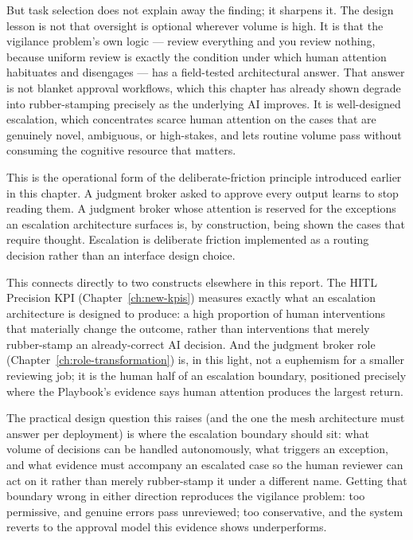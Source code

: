 But task selection does not explain away the finding; it sharpens it. The design lesson is not that oversight is optional wherever volume is high. It is that the vigilance problem's own logic --- review everything and you review nothing, because uniform review is exactly the condition under which human attention habituates and disengages --- has a field-tested architectural answer. That answer is not blanket approval workflows, which this chapter has already shown degrade into rubber-stamping precisely as the underlying AI improves. It is well-designed escalation, which concentrates scarce human attention on the cases that are genuinely novel, ambiguous, or high-stakes, and lets routine volume pass without consuming the cognitive resource that matters.

\begin{keyinsight}[title={Deliberate Friction, Operationalised}]
This is the operational form of the deliberate-friction principle introduced earlier in this chapter. A judgment broker asked to approve every output learns to stop reading them. A judgment broker whose attention is reserved for the exceptions an escalation architecture surfaces is, by construction, being shown the cases that require thought. Escalation is deliberate friction implemented as a routing decision rather than an interface design choice.

This connects directly to two constructs elsewhere in this report. The HITL Precision KPI (Chapter~\ref{ch:new-kpis}) measures exactly what an escalation architecture is designed to produce: a high proportion of human interventions that materially change the outcome, rather than interventions that merely rubber-stamp an already-correct AI decision. And the judgment broker role (Chapter~\ref{ch:role-transformation}) is, in this light, not a euphemism for a smaller reviewing job; it is the human half of an escalation boundary, positioned precisely where the Playbook's evidence says human attention produces the largest return.
\end{keyinsight}

The practical design question this raises (and the one the mesh architecture must answer per deployment) is where the escalation boundary should sit: what volume of decisions can be handled autonomously, what triggers an exception, and what evidence must accompany an escalated case so the human reviewer can act on it rather than merely rubber-stamp it under a different name. Getting that boundary wrong in either direction reproduces the vigilance problem: too permissive, and genuine errors pass unreviewed; too conservative, and the system reverts to the approval model this evidence shows underperforms.


